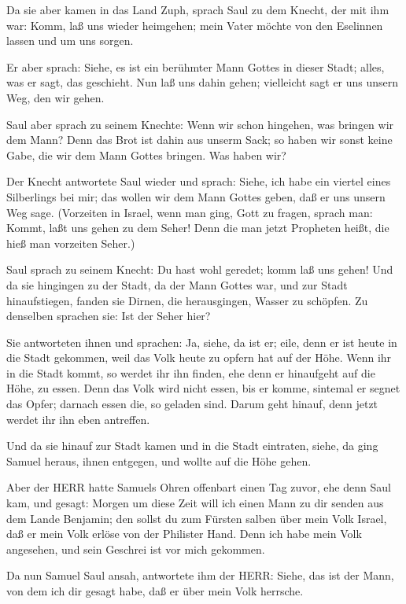  Da sie aber kamen in das Land Zuph, sprach Saul zu dem
Knecht, der mit ihm war: Komm, laß uns wieder heimgehen; mein Vater
möchte von den Eselinnen lassen und um uns sorgen.

 Er aber sprach: Siehe, es ist ein berühmter Mann Gottes in
dieser Stadt; alles, was er sagt, das geschieht. Nun laß uns dahin
gehen; vielleicht sagt er uns unsern Weg, den wir gehen.

 Saul aber sprach zu seinem Knechte: Wenn wir schon
hingehen, was bringen wir dem Mann? Denn das Brot ist dahin aus unserm
Sack; so haben wir sonst keine Gabe, die wir dem Mann Gottes bringen.
Was haben wir?

 Der Knecht antwortete Saul wieder und sprach: Siehe, ich
habe ein viertel eines Silberlings bei mir; das wollen wir dem Mann
Gottes geben, daß er uns unsern Weg sage.  (Vorzeiten in
Israel, wenn man ging, Gott zu fragen, sprach man: Kommt, laßt uns gehen
zu dem Seher! Denn die man jetzt Propheten heißt, die hieß man vorzeiten
Seher.)

 Saul sprach zu seinem Knecht: Du hast wohl geredet; komm
laß uns gehen! Und da sie hingingen zu der Stadt, da der Mann Gottes
war,  und zur Stadt hinaufstiegen, fanden sie Dirnen, die
herausgingen, Wasser zu schöpfen. Zu denselben sprachen sie: Ist der
Seher hier?

 Sie antworteten ihnen und sprachen: Ja, siehe, da ist er;
eile, denn er ist heute in die Stadt gekommen, weil das Volk heute zu
opfern hat auf der Höhe.  Wenn ihr in die Stadt kommt, so
werdet ihr ihn finden, ehe denn er hinaufgeht auf die Höhe, zu essen.
Denn das Volk wird nicht essen, bis er komme, sintemal er segnet das
Opfer; darnach essen die, so geladen sind. Darum geht hinauf, denn jetzt
werdet ihr ihn eben antreffen.

 Und da sie hinauf zur Stadt kamen und in die Stadt
eintraten, siehe, da ging Samuel heraus, ihnen entgegen, und wollte auf
die Höhe gehen.

 Aber der HERR hatte Samuels Ohren offenbart einen Tag
zuvor, ehe denn Saul kam, und gesagt:  Morgen um diese Zeit
will ich einen Mann zu dir senden aus dem Lande Benjamin; den sollst du
zum Fürsten salben über mein Volk Israel, daß er mein Volk erlöse von
der Philister Hand. Denn ich habe mein Volk angesehen, und sein Geschrei
ist vor mich gekommen.

 Da nun Samuel Saul ansah, antwortete ihm der HERR: Siehe,
das ist der Mann, von dem ich dir gesagt habe, daß er über mein Volk
herrsche.

